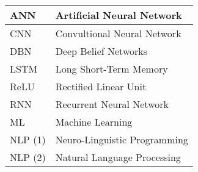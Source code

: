 



\begin{longtable}{ |p{3cm}|p{6cm}|}
		\hline
		ANN   & Artificial Neural Network\\
		\hline
		CNN   & Convultional Neural Network \\
		\hline
		DBN   & Deep Belief Networks\\
		\hline
		LSTM  & Long Short-Term Memory\\
		\hline
		ReLU  & Rectified Linear Unit\\
		\hline	
		RNN   & Recurrent Neural Network\\
		\hline
		ML 	  &  Machine Learning\\
		\hline
		NLP (1)	  & Neuro-Linguistic Programming\\
		\hline
		NLP (2)   & Natural Language Processing\\
		\hline
\end{longtable}
